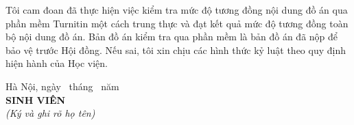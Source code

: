 Tôi cam đoan đã thực hiện việc kiểm tra mức độ tương đồng nội dung đồ án qua phần mềm
Turnitin một cách trung thực và đạt kết quả mức độ tương đồng \MucDoTuongDong{} toàn bộ
nội dung đồ án. Bản đồ án kiểm tra qua phần mềm là bản đồ án đã nộp để bảo vệ trước Hội
đồng. Nếu sai, tôi xin chịu các hình thức kỷ luật theo quy định hiện hành của Học viện.

\vspace{14mm}
\begin{flushright}
Hà Nội, ngày \NgayBaoVe\ tháng \ThangBaoVe\ năm \NamBaoVe\\[3mm]
\textbf{SINH VIÊN}\\
\textit{(Ký và ghi rõ họ tên)}\\[24mm]
\TenSinhVien
\end{flushright}

